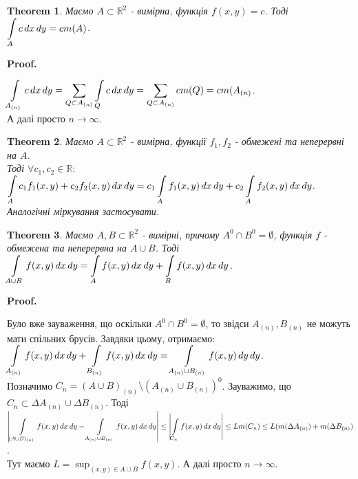 \documentclass[a4paper, 10pt]{article}
\makeatletter
\def\qed{$\blacksquare$}
\theoremstyle{theoremdd}
\newtheorem{theorem}{Theorem}[subsection]
\theoremstyle{theoremdd}
\theoremstyle{theoremdd}
\theoremstyle{theoremdd}
\theoremstyle{theoremdd}
\theoremstyle{theoremdd}
\theoremstyle{theoremdd}
\theoremstyle{theoremdd}
\renewenvironment{proof}[1][Proof.\\]{\par
\pushQED{\hfill \qed}%
\normalfont \topsep6\p@\@plus6\p@\relax
\trivlist
\item\relax
{\bfseries
#1\@addpunct{.}}\hspace\labelsep\ignorespaces
}{%
\popQED\endtrivlist\@endpefalse
}
\makeatother
\begin{document}
\begin{theorem}
Маємо $A \subset \mathbb{R}^2$ - вимірна, функція $f(x,y) =c $. Тоді\\
$\displaystyle\int\displaylimits_A c\,dx\,dy = cm(A)$.
\end{theorem}

\begin{proof}
$\displaystyle\int\displaylimits_{A_{(n)}} c\,dx\,dy = \sum_{Q \subset A_{(n)}} \int\displaylimits_Q c\,dx\,dy = \sum_{Q \subset A_{(n)}} c m(Q) = c m(A_{(n)}$.\\
А далі просто $n \to \infty$.
\end{proof}

\begin{theorem}
Маємо $A \subset \mathbb{R}^2$ - вимірна, функції $f_1,f_2$ - обмежені та неперервні на $A$. \\
Тоді $\forall c_1,c_2 \in \mathbb{R}:$\\
$\displaystyle\int\displaylimits_A c_1 f_1(x,y) + c_2 f_2(x,y)\,dx\,dy = c_1 \int\displaylimits_A f_1(x,y) \,dx\,dy + c_2 \int\displaylimits_A f_2(x,y)\,dx\,dy$.\\
\textit{Аналогічні міркування застосувати.}
\end{theorem}

\begin{theorem}
Маємо $A,B \subset \mathbb{R}^2$ - вимірні, причому $A^0 \cap B^0 = \emptyset$, функція $f$ - обмежена та неперервна на $A \cup B$. Тоді\\
$\displaystyle\int\displaylimits_{A \cup B} f(x,y)\,dx\,dy = \int\displaylimits_{A} f(x,y)\,dx\,dy + \int\displaylimits_{B} f(x,y)\,dx\,dy$.
\end{theorem}

\begin{proof}
Було вже зауваження, що оскільки $A^0 \cap B^0 = \emptyset$, то звідси $A_{(n)},B_{(n)}$ не можуть мати спільних брусів. Завдяки цьому, отримаємо:\\
$\displaystyle\int\displaylimits_{A_{(n)}} f(x,y)\,dx\,dy + \int\displaylimits_{B_{(n)}} f(x,y)\,dx\,dy = \int\displaylimits_{A_{(n)} \cup B_{(n)}} f(x,y)\,dy\,dy$.\\
Позначимо $C_n = (A \cup B)_{(n)} \setminus ( A_{(n)} \cup B_{(n)} )^0$. Зауважимо, що $C_n \subset \Delta A_{(n)} \cup \Delta B_{(n)}$. Тоді\\
$\displaystyle\abs{\int\displaylimits_{(A \cup B)_{(n)}} f(x,y)\,dx\,dy - \int\displaylimits_{A_{(n)} \cup B_{(n)}} f(x,y)\,dx\,dy} \leq \abs{\int\displaylimits_{C_n} f(x,y)\,dx\,dy} \leq L m(C_n) \leq L(m(\Delta A_{(n)}) + m(\Delta B_{(n)})$.\\
Тут маємо $L = \displaystyle\sup_{(x,y) \in A \cup B} f(x,y)$. А далі просто $n \to \infty$.
\end{proof}
\end{document}
